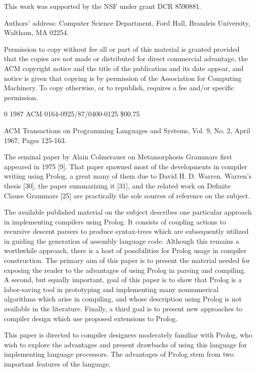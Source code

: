 \bigskip
This work was supported by the NSF under grant DCR 8590881.

Authors’ address: Computer Science Department, Ford Hall, Brandeis University, Waltham, MA
02254.

Permission to copy without fee all or part of this material is granted provided that the copies are not
made or distributed for direct commercial advantage, the ACM copyright notice and the title of the
publication and its date appear, and notice is given that copying is by permission of the Association
for Computing Machinery. To copy otherwise, or to republish, requires a fee and/or specific
permission.

0 1987 ACM 0164-0925/87/0400-0125 \$00.75

ACM Transactions on Programming Languages and Systems, Vol. 9, No. 2, April 1967, Pages 125-163. 


The seminal paper by Alain Colmerauer on Metamorphosis Grammars first
appeared in 1975 [9]. That paper spawned most of the developments in compiler
writing using Prolog, a great many of them due to David H. D. Warren. Warren’s
thesis [30], the paper summarizing it [31], and the related work on Definite
Clause Grammars [25] are practically the sole sources of reference on the
subject.

The available published material on the subject describes one particular approach
in implementing compilers using Prolog. It consists of coupling actions 
to recursive descent parsers to produce syntax-trees which are subsequently
utilized in guiding the generation of assembly language code. Although this
remains a worthwhile approach, there is a host of possibilities for Prolog usage
in compiler construction. The primary aim of this paper is to present the material
needed for exposing the reader to the advantages of using Prolog in parsing and
compiling. A second, but equally important, goal of this paper is to show that
Prolog is a labor-saving tool in prototyping and implementing many nonnumerical
algorithms which arise in compiling, and whose description using
Prolog is not available in the literature. Finally, a third goal is to present new
approaches to compiler design which use proposed extensions to Prolog. 

This paper is directed to compiler designers moderately familiar with Prolog,
who wish to explore the advantages and present drawbacks of using this language
for implementing language processors. The advantages of Prolog stem from two
important features of the language. 

